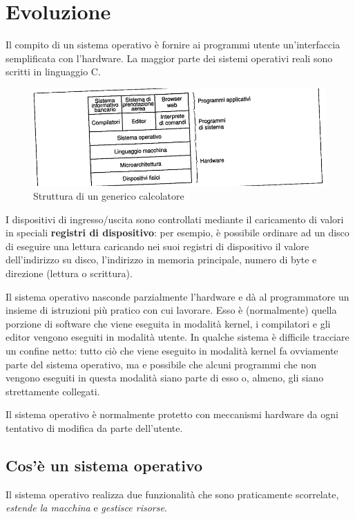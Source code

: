 \chapter{Evoluzione}
\thispagestyle{empty}
Il compito di un sistema operativo è fornire ai programmi utente un'interfaccia semplificata con l'hardware.
La maggior parte dei sistemi operativi reali sono scritti in linguaggio C.

\begin{figure}[h!]
    \centering
    \includegraphics[width=0.7\linewidth]{assets/calcolatore1.png}
    \caption{Struttura di un generico calcolatore}
\end{figure}

I dispositivi di ingresso/uscita sono controllati mediante il caricamento di valori in speciali \textbf{registri di dispositivo}: per esempio, è possibile ordinare ad un disco di eseguire una lettura caricando nei suoi registri di dispositivo il valore dell'indirizzo su disco, l'indirizzo in memoria principale, numero di byte e direzione (lettura o scrittura).

Il sistema operativo nasconde parzialmente l'hardware e dà al programmatore un insieme di istruzioni più pratico con cui lavorare.
Esso è (normalmente) quella porzione di software che viene eseguita in modalità kernel, i compilatori e gli editor vengono eseguiti in modalità utente.
In qualche sistema è difficile tracciare un confine netto: tutto ciò che viene eseguito in modalità kernel fa ovviamente parte del sistema operativo, ma e possibile che alcuni programmi che non vengono eseguiti in questa modalità siano parte di esso o, almeno, gli siano strettamente collegati.

Il sistema operativo è normalmente protetto con meccanismi hardware da ogni tentativo di modifica da parte dell'utente.

\section{Cos'è un sistema operativo}
Il sistema operativo realizza due funzionalità che sono praticamente scorrelate, \textit{estende la macchina} e \textit{gestisce risorse}.


